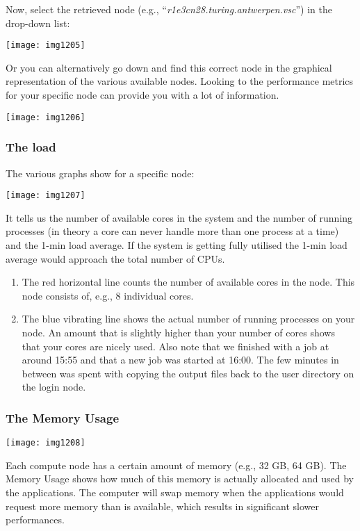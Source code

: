 Now, select the retrieved node (e.g., ``\emph{r1e3cn28.turing.antwerpen.vsc}'')
in the drop-down list:

\texttt{[image: img1205]}

Or you can alternatively go down and find this correct node in the graphical
representation of the various available nodes.  Looking to the performance
metrics for your specific node can provide you with a lot of information.

\texttt{[image: img1206]}

\subsubsection{The load}

The various graphs show for a specific node:

\texttt{[image: img1207]}

It tells us the number of available cores in the system and the number of
running processes (in theory a core can never handle more than one process at a
time) and the 1-min load average. If the system is getting fully utilised the
1-min load average would approach the total number of CPUs.

\begin{enumerate}
\item The red horizontal line counts the number of available cores in the node. This node consists of, e.g., 8 individual cores.
\item  The blue vibrating line shows the actual number of running processes on
  your node. An amount that is slightly higher than your number of cores shows
  that your cores are nicely used. Also note that we finished with a job at
  around 15:55 and that a new job was started at 16:00. The few minutes in
  between was spent with copying the output files back to the user directory on
  the login node.
\end{enumerate}

\subsubsection{The Memory Usage}

\texttt{[image: img1208]}

Each compute node has a certain amount of memory (e.g., 32 GB, 64 GB).  The
Memory Usage shows how much of this memory is actually allocated and used by
the applications.  The computer will swap memory when the applications would
request more memory than is available, which results in significant slower
performances.


